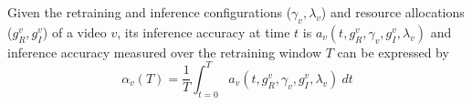 Given the retraining and inference configurations ($\gamma_v,\lambda_v$) and resource allocations ($g^{v}_R, g^{v}_I$) of a video $v$, its inference accuracy at time $t$ is
$a_v(t, g^v_R, \gamma_v, g^v_I, \lambda_v)$ and inference accuracy measured over the retraining window $T$ can be expressed by 
\[
\alpha_v (T) = \frac{1}{T} \int_{t=0}^{T} a_v(t, g^v_R, \gamma_v, g^v_I, \lambda_v)\ dt
\]





%

